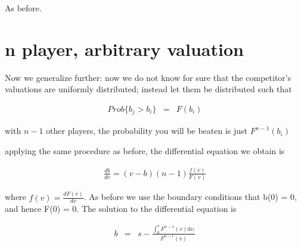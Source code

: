 \documentclass{article}
\begin{document}
As before.

\section{n player, arbitrary valuation}

Now we generalize further: now we do not know for sure that the competitor's valuations are uniformly distributed; instead let them be distributed such that

\begin{eqnarray*}
Prob\{b_j > b_i\} &=& F(b_i)
\end{eqnarray*}

with $n - 1$ other players, the probability you will be beaten is just $F^{n-1}(b_i)$

applying the same procedure as before, the differential equation we obtain is

\begin{eqnarray*}
\frac{d b}{d v} = (v - b)(n - 1)\frac{f(v)}{F(v)}
\end{eqnarray*}

where $f(v) = \frac{d F(v)}{d v}$. As before we use the boundary conditions that b(0) = 0, and hence F(0) = 0. The solution to the differential equation is

\begin{eqnarray*}
b &=& s - \frac{\int_0^v F^{n-1}(v) \mathrm{d}v.}{F^{n-1}(v)}
\end{eqnarray*}
\end{document}

